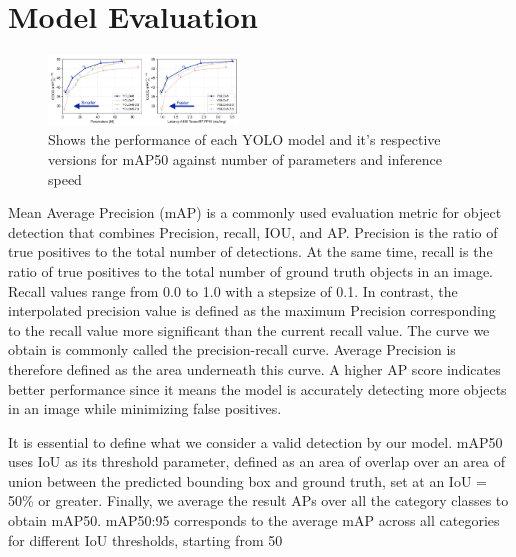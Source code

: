 \documentclass[10pt,twocolumn,letterpaper]{article}
\begin{document}
\section{Model Evaluation}

\begin{figure}[h]
    \centering
    \includegraphics[width=0.45\textwidth]{YOLO Model Performance.png}
    \caption{Shows the performance of each YOLO model and it's respective versions for mAP50 against number of parameters and inference speed}
    \label{fig:my_label}
\end{figure}

Mean Average Precision (mAP) is a commonly used evaluation metric for object detection that combines Precision, recall, IOU, and AP. Precision is the ratio of true positives to the total number of detections. At the same time, recall is the ratio of true positives to the total number of ground truth objects in an image. Recall values range from 0.0 to 1.0 with a stepsize of 0.1. In contrast, the interpolated precision value is defined as the maximum Precision corresponding to the recall value more significant than the current recall value. The curve we obtain is commonly called the precision-recall curve. Average Precision is therefore defined as the area underneath this curve. A higher AP score indicates better performance since it means the model is accurately detecting more objects in an image while minimizing false positives. 

It is essential to define what we consider a valid detection by our model. mAP50 uses IoU as its threshold parameter, defined as an area of overlap over an area of union between the predicted bounding box and ground truth, set at an IoU = 50\% or greater. Finally, we average the result APs over all the category classes to obtain mAP50. mAP50:95 corresponds to the average mAP across all categories for different IoU thresholds, starting from 50%
\end{document}
